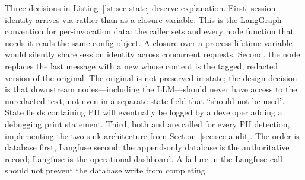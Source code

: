 Three decisions in Listing~\ref{lst:sec-state} deserve explanation.
First, session identity arrives via  rather than as a closure variable. This is the LangGraph
convention for per-invocation data: the caller sets
 and every
node function that needs it reads the same config object. A closure
over a process-lifetime variable would silently share session identity
across concurrent requests. Second, the node replaces the last message
with a new  whose content is the tagged, redacted
version of the original. The original is not preserved in state; the
design decision is that downstream nodes---including the LLM---should
never have access to the unredacted text, not even in a separate state
field that ``should not be used''. State fields containing PII will
eventually be logged by a developer adding a debugging print statement.
Third, both  and  are
called for every PII detection, implementing the two-sink architecture
from Section~\ref{sec:sec-audit}. The order is database first, Langfuse
second: the append-only database is the authoritative record; Langfuse
is the operational dashboard. A failure in the Langfuse call should not
prevent the database write from completing.


